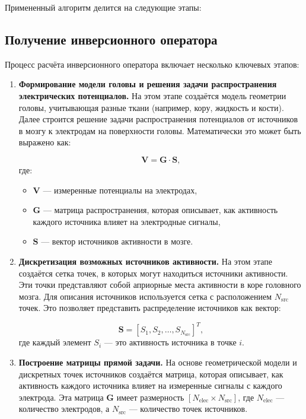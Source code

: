 Примененный алгоритм делится на следующие этапы:

\subsection{Получение инверсионного оператора}


Процесс расчёта инверсионного оператора включает несколько ключевых этапов:

\begin{enumerate}
    \item \textbf{Формирование модели головы и решения задачи распространения электрических потенциалов.} На этом этапе создаётся модель геометрии головы, учитывающая разные ткани (например, кору, жидкость и кости). Далее строится решение задачи распространения потенциалов от источников в мозгу к электродам на поверхности головы. Математически это может быть выражено как:

    \begin{equation}
    \mathbf{V} = \mathbf{G} \cdot \mathbf{S},
    \end{equation}
    где:
    \begin{itemize}
        \item \(\mathbf{V}\) — измеренные потенциалы на электродах,
        \item \(\mathbf{G}\) — матрица распространения, которая описывает, как активность каждого источника влияет на электродные сигналы,
        \item \(\mathbf{S}\) — вектор источников активности в мозге.
    \end{itemize}
    
    \item \textbf{Дискретизация возможных источников активности.} На этом этапе создаётся сетка точек, в которых могут находиться источники активности. Эти точки представляют собой априорные места активности в коре головного мозга. Для описания источников используется сетка с расположением \(N_{\text{src}}\) точек. Это позволяет представить распределение источников как вектор:

    \begin{equation}
    \mathbf{S} = \left[ S_1, S_2, \dots, S_{N_{\text{src}}} \right]^T,
    \end{equation}
    где каждый элемент \(S_i\) — это активность источника в точке \(i\).

    \item \textbf{Построение матрицы прямой задачи.} На основе геометрической модели и дискретных точек источников создаётся матрица, которая описывает, как активность каждого источника влияет на измеренные сигналы с каждого электрода. Эта матрица \(\mathbf{G}\) имеет размерность \([N_{\text{elec}} \times N_{\text{src}}]\), где \(N_{\text{elec}}\) — количество электродов, а \(N_{\text{src}}\) — количество точек источников.


\end{enumerate}
